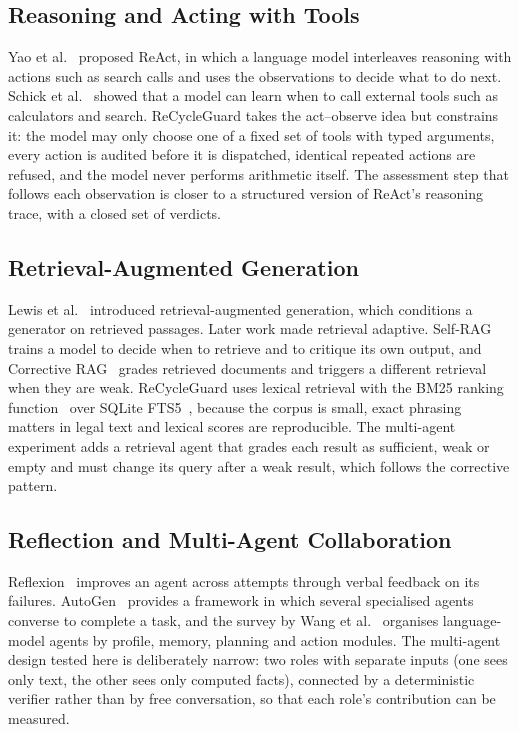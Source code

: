 \subsection{Reasoning and Acting with Tools}
Yao et al.~\cite{yao2023react} proposed ReAct, in which a language model interleaves reasoning
with actions such as search calls and uses the observations to decide what to do next. Schick et
al.~\cite{schick2023toolformer} showed that a model can learn when to call external tools such as
calculators and search. ReCycleGuard takes the act--observe idea but constrains it: the model may
only choose one of a fixed set of tools with typed arguments, every action is audited before it is
dispatched, identical repeated actions are refused, and the model never performs arithmetic
itself. The assessment step that follows each observation is closer to a structured version of
ReAct's reasoning trace, with a closed set of verdicts.

\subsection{Retrieval-Augmented Generation}
Lewis et al.~\cite{lewis2020rag} introduced retrieval-augmented generation, which conditions a
generator on retrieved passages. Later work made retrieval adaptive. Self-RAG~\cite{asai2024selfrag}
trains a model to decide when to retrieve and to critique its own output, and Corrective
RAG~\cite{yan2024crag} grades retrieved documents and triggers a different retrieval when they are
weak. ReCycleGuard uses lexical retrieval with the BM25 ranking function~\cite{robertson2009bm25}
over SQLite FTS5~\cite{fts5}, because the corpus is small, exact phrasing matters in legal text and
lexical scores are reproducible. The multi-agent experiment adds a retrieval agent that grades each
result as sufficient, weak or empty and must change its query after a weak result, which follows
the corrective pattern.

\subsection{Reflection and Multi-Agent Collaboration}
Reflexion~\cite{shinn2023reflexion} improves an agent across attempts through verbal feedback on
its failures. AutoGen~\cite{wu2023autogen} provides a framework in which several specialised agents
converse to complete a task, and the survey by Wang et al.~\cite{wang2024survey} organises
language-model agents by profile, memory, planning and action modules. The multi-agent design
tested here is deliberately narrow: two roles with separate inputs (one sees only text, the other
sees only computed facts), connected by a deterministic verifier rather than by free conversation,
so that each role's contribution can be measured.

